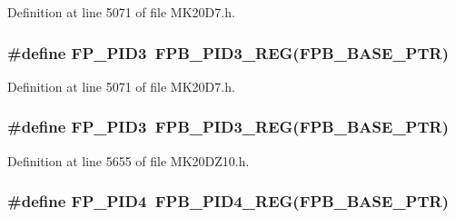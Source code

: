 Definition at line 5071 of file M\+K20\+D7.\+h.

\subsubsection[{\texorpdfstring{F\+P\+\_\+\+P\+I\+D3}{FP_PID3}}]{\setlength{\rightskip}{0pt plus 5cm}\#define F\+P\+\_\+\+P\+I\+D3~{\bf F\+P\+B\+\_\+\+P\+I\+D3\+\_\+\+R\+EG}({\bf F\+P\+B\+\_\+\+B\+A\+S\+E\+\_\+\+P\+TR})}\hypertarget{group___f_p_b___register___accessor___macros_ga00e216d1c7ecd27c93d111244f266a1a}{}\label{group___f_p_b___register___accessor___macros_ga00e216d1c7ecd27c93d111244f266a1a}


Definition at line 5071 of file M\+K20\+D7.\+h.

\subsubsection[{\texorpdfstring{F\+P\+\_\+\+P\+I\+D3}{FP_PID3}}]{\setlength{\rightskip}{0pt plus 5cm}\#define F\+P\+\_\+\+P\+I\+D3~{\bf F\+P\+B\+\_\+\+P\+I\+D3\+\_\+\+R\+EG}({\bf F\+P\+B\+\_\+\+B\+A\+S\+E\+\_\+\+P\+TR})}\hypertarget{group___f_p_b___register___accessor___macros_ga00e216d1c7ecd27c93d111244f266a1a}{}\label{group___f_p_b___register___accessor___macros_ga00e216d1c7ecd27c93d111244f266a1a}


Definition at line 5655 of file M\+K20\+D\+Z10.\+h.

\subsubsection[{\texorpdfstring{F\+P\+\_\+\+P\+I\+D4}{FP_PID4}}]{\setlength{\rightskip}{0pt plus 5cm}\#define F\+P\+\_\+\+P\+I\+D4~{\bf F\+P\+B\+\_\+\+P\+I\+D4\+\_\+\+R\+EG}({\bf F\+P\+B\+\_\+\+B\+A\+S\+E\+\_\+\+P\+TR})}\hypertarget{group___f_p_b___register___accessor___macros_gafc4799598484062cc91fe7765e4491cf}{}\label{group___f_p_b___register___accessor___macros_gafc4799598484062cc91fe7765e4491cf}


